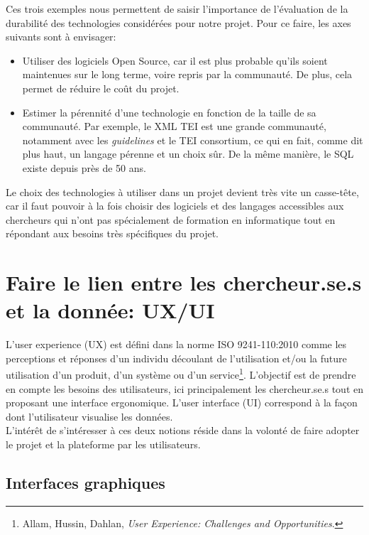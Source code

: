Ces trois exemples nous permettent de saisir l’importance de l’évaluation de la durabilité des technologies considérées pour notre projet. Pour ce faire, les axes suivants sont à envisager:\\

\begin{itemize}
    \item Utiliser des logiciels Open Source, car il est plus probable qu’ils soient maintenues sur le long terme, voire repris par la communauté. De plus, cela permet de réduire le coût du projet.
    \item Estimer la pérennité d’une technologie en fonction de la taille de sa communauté. Par exemple, le XML TEI est une grande communauté, notamment avec les \textit{guidelines} et le TEI consortium, ce qui en fait, comme dit plus haut, un langage pérenne et un choix sûr. De la même manière, le SQL existe depuis près de 50 ans.\\
    
\end{itemize}


Le choix des technologies à utiliser dans un projet devient très vite un casse-tête, car il faut pouvoir à la fois choisir des logiciels et des langages accessibles aux chercheurs qui n’ont pas spécialement de formation en informatique tout en répondant aux besoins très spécifiques du projet.


    \section{Faire le lien entre les chercheur.se.s et la donnée: UX/UI}

L’user experience (UX) est défini dans la norme ISO 9241-110:2010 comme les perceptions et réponses d’un individu découlant de l’utilisation et/ou la future utilisation d’un produit, d’un système ou d’un service\footnote{Allam, Hussin, Dahlan, \textit{User Experience: Challenges and Opportunities}.}. L’objectif est de prendre en compte les besoins des utilisateurs, ici principalement les chercheur.se.s tout en proposant une interface ergonomique. L’user interface (UI) correspond à la façon dont l’utilisateur visualise les données. \\
L’intérêt de s’intéresser à ces deux notions réside dans la volonté de faire adopter le projet et la plateforme par les utilisateurs. 
    
    \subsection{Interfaces graphiques}

